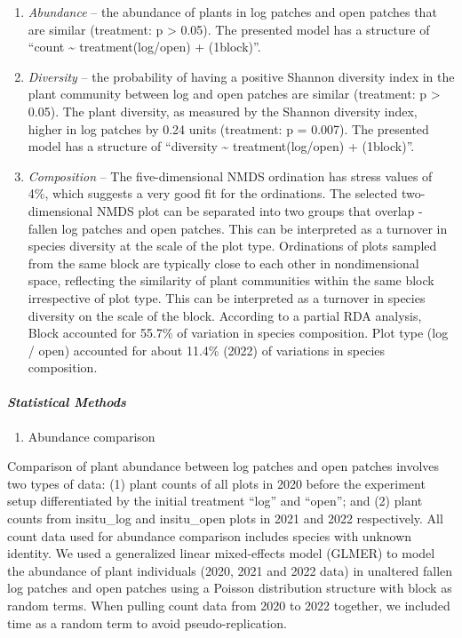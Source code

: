 \documentclass[
]{article}
\providecommand{\tightlist}{%
  \setlength{\itemsep}{0pt}\setlength{\parskip}{0pt}}
\begin{document}
\begin{enumerate}
\def\labelenumi{\arabic{enumi}.}
\tightlist
\item
  \emph{Abundance} -- the abundance of plants in log patches and open
  patches that are similar (treatment: p \textgreater{} 0.05). The
  presented model has a structure of ``count \textasciitilde{}
  treatment(log/open) + (1\textbar block)''.
\item
  \emph{Diversity} -- the probability of having a positive Shannon
  diversity index in the plant community between log and open patches
  are similar (treatment: p \textgreater{} 0.05). The plant diversity,
  as measured by the Shannon diversity index, higher in log patches by
  0.24 units (treatment: p = 0.007). The presented model has a structure
  of ``diversity \textasciitilde{} treatment(log/open) +
  (1\textbar block)''.
\item
  \emph{Composition} -- The five-dimensional NMDS ordination has stress
  values of 4\%, which suggests a very good fit for the ordinations. The
  selected two-dimensional NMDS plot can be separated into two groups
  that overlap - fallen log patches and open patches. This can be
  interpreted as a turnover in species diversity at the scale of the
  plot type. Ordinations of plots sampled from the same block are
  typically close to each other in nondimensional space, reflecting the
  similarity of plant communities within the same block irrespective of
  plot type. This can be interpreted as a turnover in species diversity
  on the scale of the block. According to a partial RDA analysis, Block
  accounted for 55.7\% of variation in species composition. Plot type
  (log / open) accounted for about 11.4\% (2022) of variations in
  species composition.
\end{enumerate}

\hypertarget{statistical-methods}{%
\paragraph{\texorpdfstring{\emph{Statistical Methods}
}{Statistical Methods  }}\label{statistical-methods}}

\begin{enumerate}
\def\labelenumi{\arabic{enumi}.}
\tightlist
\item
  Abundance comparison
\end{enumerate}

Comparison of plant abundance between log patches and open patches
involves two types of data: (1) plant counts of all plots in 2020 before
the experiment setup differentiated by the initial treatment ``log'' and
``open''; and (2) plant counts from insitu\_log and insitu\_open plots
in 2021 and 2022 respectively. All count data used for abundance
comparison includes species with unknown identity. We used a generalized
linear mixed-effects model (GLMER) to model the abundance of plant
individuals (2020, 2021 and 2022 data) in unaltered fallen log patches
and open patches using a Poisson distribution structure with block as
random terms. When pulling count data from 2020 to 2022 together, we
included time as a random term to avoid pseudo-replication.
\end{document}
